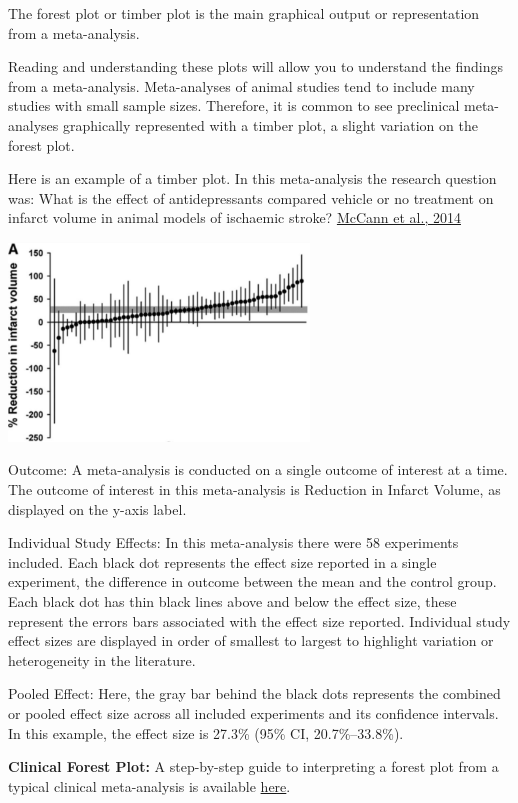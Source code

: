 \documentclass[
]{book}
\begin{document}
The forest plot or timber plot is the main graphical output or representation from a meta-analysis.

Reading and understanding these plots will allow you to understand the findings from a meta-analysis. Meta-analyses of animal studies tend to include many studies with small sample sizes. Therefore, it is common to see preclinical meta-analyses graphically represented with a timber plot, a slight variation on the forest plot.

Here is an example of a timber plot. In this meta-analysis the research question was: What is the effect of antidepressants compared vehicle or no treatment on infarct volume in animal models of ischaemic stroke? \href{https://doi.org/10.1161/STROKEAHA.114.006304}{McCann et al., 2014}

\includegraphics[width=0.6\textwidth,height=\textheight]{figs/timberplot.png}

Outcome:
A meta-analysis is conducted on a single outcome of interest at a time. The outcome of interest in this meta-analysis is Reduction in Infarct Volume, as displayed on the y-axis label.

Individual Study Effects:
In this meta-analysis there were 58 experiments included. Each black dot represents the effect size reported in a single experiment, the difference in outcome between the mean and the control group. Each black dot has thin black lines above and below the effect size, these represent the errors bars associated with the effect size reported. Individual study effect sizes are displayed in order of smallest to largest to highlight variation or heterogeneity in the literature.

Pooled Effect:
Here, the gray bar behind the black dots represents the combined or pooled effect size across all included experiments and its confidence intervals. In this example, the effect size is 27.3\% (95\% CI, 20.7\%--33.8\%).

\textbf{Clinical Forest Plot:} A step-by-step guide to interpreting a forest plot from a typical clinical meta-analysis is available \href{https://s4be.cochrane.org/blog/2016/07/11/tutorial-read-forest-plot/}{here}.
\end{document}
